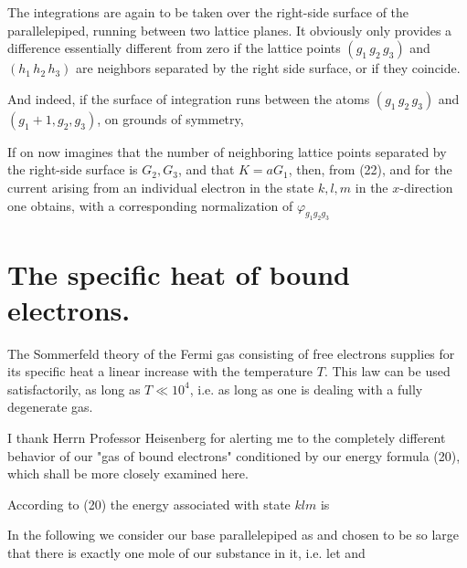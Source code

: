 \begin{paper}{1}
The integrations are again to be taken over the right-side surface of the parallelepiped, running between two lattice planes. It obviously only provides a difference essentially different from zero if the lattice points $(g_1\,g_2\,g_3)$ and $(h_1\,h_2\,h_3)$ are neighbors separated by the right side surface, or if they coincide.

And indeed, if the surface of integration runs between the atoms $(g_1\,g_2\,g_3)$ and $(g_1+1,g_2,g_3)$, on grounds of symmetry,

If on now imagines that the number of neighboring lattice points separated by the right-side surface is $G_2, G_3$, and that $K=aG_1$, then, from (22),
and for the current arising from an individual electron in the state $k,l,m$ in the $x$-direction one obtains, with a corresponding normalization of $\varphi_{g_1g_2g_3}$

\section{The specific heat of bound electrons.}
The Sommerfeld theory of the Fermi gas consisting of free electrons supplies for its specific heat a linear increase with the temperature $T$. This law can be used satisfactorily, as long as $T \ll 10^4$, i.e. as long as one is dealing with a fully degenerate gas.

I thank Herrn Professor Heisenberg for alerting me to the completely different behavior of our "gas of bound electrons" conditioned by our energy formula (20), which shall be more closely examined here.

According to (20) the energy associated with state $klm$ is

In the following we consider our base parallelepiped as  and chosen to be so large that there is exactly one mole of our substance in it, i.e. let
and


\end{paper}
